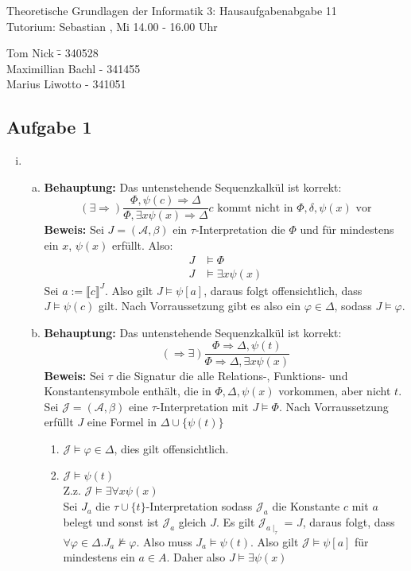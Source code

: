 \documentclass[a4paper,10pt]{article}
\begin{document}
\begin{center}
\Large{Theoretische Grundlagen der Informatik 3: Hausaufgabenabgabe 11} \\
\large{Tutorium: Sebastian , Mi 14.00 - 16.00 Uhr}
\end{center}
\begin{tabbing}
Tom Nick \hspace{2cm}\= - 340528\\
Maximillian Bachl \> - 341455 \\
Marius Liwotto\> -  341051
\end{tabbing}
\subsection*{Aufgabe 1}
\begin{enumerate}[(i)]
	\item
	\begin{enumerate}[a)]
	
		\item \textbf{Behauptung: } Das untenstehende Sequenzkalkül ist korrekt:
		\[ (\exists \Rightarrow) \frac{\Phi, \psi(c) \Rightarrow \Delta}{\Phi, \exists x \psi(x)\Rightarrow \Delta} c \text{ kommt nicht in $\Phi,\delta,\psi(x)$ vor}\]
		\textbf{Beweis:} 
		Sei $J = (\mathcal{A},\beta)$ ein $\tau$-Interpretation die $\Phi$ und für mindestens ein $x$, $\psi(x)$ erfüllt. Also:
		\begin{align*}
			J &\vDash \Phi \\
			J &\vDash \exists x \psi(x)
		\end{align*}
		Sei $a := \llbracket c \rrbracket^{J}$. Also gilt $J \vDash \psi[a]$, daraus folgt offensichtlich, dass $J \vDash \psi(c)$ gilt. Nach Vorraussetzung gibt es also ein $\varphi \in \Delta$, sodass $J \vDash \varphi$.
		\item \textbf{Behauptung: } Das untenstehende Sequenzkalkül ist korrekt:
		\[ (\Rightarrow \exists) \frac{\Phi \Rightarrow \Delta,\psi(t)}{\Phi \Rightarrow \Delta, \exists x \psi (x)} \]
		\textbf{Beweis:} 
		Sei $\tau$ die Signatur die alle Relations-, Funktions- und Konstantensymbole enthält, die in $\Phi, \Delta, \psi(x)$ vorkommen, aber nicht $t$.
		Sei $\mathcal{J} = (\mathcal{A},\beta)$ eine $\tau$-Interpretation mit $J \vDash \Phi$.
		Nach Vorraussetzung erfüllt $J$ eine Formel in $\Delta \cup \{ \psi(t) \}$
		\begin{enumerate}
			\item $\mathcal{J} \vDash \varphi \in \Delta$, dies gilt offensichtlich.
			\item $\mathcal{J} \vDash \psi(t)$ \\
			Z.z. $\mathcal{J} \vDash \exists \forall x \psi(x)$ \\
			Sei $J_a$ die $\tau \cup \{t\}$-Interpretation sodass $\mathcal{J}_a$ die Konstante $c$ mit $a$ belegt und sonst ist $\mathcal{J}_a$ gleich $J$.
			Es gilt $\mathcal{J}_{a\mid_\tau}$ = $J$, daraus folgt, dass $\forall \varphi \in \Delta.J_a \not \vDash \varphi$. Also muss $J_a \vDash \psi(t)$.
			Also gilt $\mathcal{J} \vDash \psi[a]$ für mindestens ein $a \in A$. Daher also $J \vDash \exists \psi (x)$
		\end{enumerate}
	\end{enumerate}
\end{enumerate}
\end{document}
